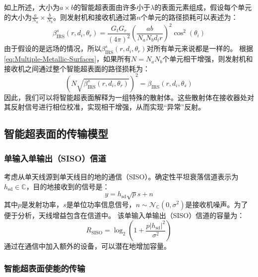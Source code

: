 \documentclass[supercite]{HustGraduPaper}
\begin{document}
如上所述，大小为$a \times b$的智能超表面由许多小于$\lambda$的表面元素组成，假设每个单元的大小为$\frac{a}{N_a} \times \frac{b}{N_b}$。则发射机和接收机通过第$n$个单元的路径损耗可以表述为：
\begin{equation}
	\beta_{\mathrm{IRS}}^{s}\left(r, d_{i}, \theta_{r}\right)=\frac{G_{t} G_{r}}{(4 \pi)^{2}}\left(\frac{a b}{N_{a} N_{b} d_{i} r}\right)^{2} \cos ^{2}\left(\theta_{i}\right)
\end{equation}
由于假设的是远场的情况，所以$\beta_{\mathrm{IRS}}^{s}\left(r, d_{i}, \theta_{r}\right)$对所有单元来说都是一样的。
根据\autoref{eq:Multiple-Metallic-Surfaces}，如果所有$N=N_a N_b$个单元相干增强，则发射机和接收机之间通过整个智能超表面的路径损耗为：
\begin{equation}
	\left(N \sqrt{\beta_{\mathrm{IRS}}^{s}\left(r, d_{i}, \theta_{r}\right)}\right)^{2}=\beta_{\mathrm{IRS}}\left(r, d_{i}, \theta_{s}\right)
\end{equation}
因此，我们可以将智能超表面解释为一组特殊的散射体。这些散射体在接收器处对其反射信号进行相位校准，实现相干增强，从而实现“异常”反射。

\subsection{智能超表面的传输模型}\label{subsec:transmission}

\subsubsection{单输入单输出（SISO）信道}

考虑从单天线源到单天线目的地的通信（SISO）。确定性平坦衰落信道表示为$h_{\mathrm{sd}} \in \mathbb{C}$，目的地接收到的信号是：
\begin{equation}
	y=h_{\mathrm{sd}} \sqrt{p} s + n
\end{equation}
其中$p$是发射功率，$s$是单位功率信息信号，$n \sim \mathcal{N}_{\mathbb{C}}\left(0, \sigma^{2}\right)$是接收机噪声。为了便于分析，天线增益包含在信道中。
该单输入单输出（SISO）信道的容量为：
\begin{equation}
	R_{\mathrm{SISO}}=\log _{2}\left(1+\frac{p\left|h_{\mathrm{sd}}\right|^{2}}{\sigma^{2}}\right)
\end{equation}
通过在通信中加入额外的设备，可以潜在地增加容量。

\subsubsection{智能超表面使能的传输}
\end{document}
